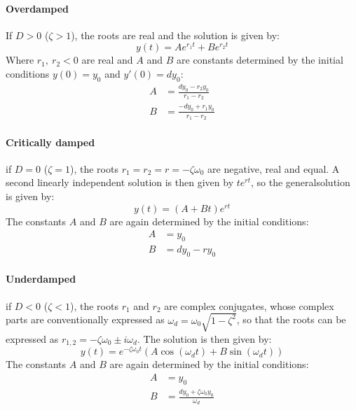 \documentclass[we,twoside,openright,a4paper,11pt]{uantwerpenbamathesis}
\begin{document}
\paragraph{Overdamped} If $D>0$ ($\zeta>1$), the roots are real and the solution is given by:
\begin{equation}\label{eq:damped_harmonic_oscillator_overdamped_solution}
    y(t)=Ae^{r_1t}+Be^{r_2t}
\end{equation}
Where $r_1,\ r_2<0$ are real and $A$ and $B$ are constants determined by the initial conditions $y(0)=y_0$ and $y'(0)=dy_0$:
\begin{equation}\label{eq:damped_harmonic_oscillator_overdamped_constants}
    \begin{split}
        A&=\frac{dy_0-r_2y_0}{r_1-r_2}\\
        B&=\frac{-dy_0+r_1y_0}{r_1-r_2}
    \end{split}
\end{equation}

\paragraph{Critically damped} if $D=0$ ($\zeta=1$), the roots $r_1=r_2=r=-\zeta\omega_0$ are negative, real and equal. A second linearly independent solution is then given by $te^{rt}$, so the generalsolution is given by:
\begin{equation}\label{eq:damped_harmonic_oscillator_critically_damped_solution}
    y(t)=(A+Bt)e^{rt}
\end{equation}
The constants $A$ and $B$ are again determined by the initial conditions:
\begin{equation}\label{eq:damped_harmonic_oscillator_critically_damped_constants}
    \begin{split}
        A&=y_0\\
        B&=dy_0-ry_0
    \end{split}
\end{equation}

\paragraph{Underdamped} if $D<0$ ($\zeta<1$), the roots $r_1$ and $r_2$ are complex conjugates, whose complex parts are conventionally expressed as $\omega_d=\omega_0\sqrt{1-\zeta^2}$, so that the roots can be expressed as $r_{1,2}=-\zeta\omega_0\pm i\omega_d$. The solution is then given by:
\begin{equation}\label{eq:damped_harmonic_oscillator_underdamped_solution}
    y(t)=e^{-\zeta\omega_0t}(A\cos(\omega_dt)+B\sin(\omega_dt))
\end{equation}
The constants $A$ and $B$ are again determined by the initial conditions:
\begin{equation}\label{eq:damped_harmonic_oscillator_underdamped_constants}
    \begin{split}
        A&=y_0\\
        B&=\frac{dy_0+\zeta\omega_0y_0}{\omega_d}
    \end{split}
\end{equation}
\end{document}
